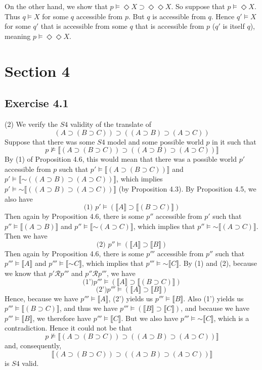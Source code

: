 \documentclass{article}
\newcommand*{\oldneg}{\mathord{\sim}}
\newcommand{\lbc}{\llbracket}
\newcommand{\rbc}{\rrbracket}
\theoremstyle{definition}
\begin{document}
On the other hand, we show that $p\vDash\Diamond X\supset\Diamond\Diamond X$. So suppose that 
$p\vDash\Diamond X$. Thus $q\vDash X$ for some $q$ accessible from $p$. But $q$ is accessible from 
$q$. Hence $q'\vDash X$ for some $q'$ that is accessible from some $q$ that is accessible from 
$p$ ($q'$ is itself $q$), meaning $p\vDash\Diamond\Diamond X$.

\section*{Section 4}

\subsection*{Exercise 4.1}
(2) We verify the $S4$ validity of the translate of
\[ (A\supset(B\supset C))\supset((A\supset B)\supset(A\supset C)) \]
Suppose that there was some $S4$ model and some possible world $p$ in it such that 
\[ p\nvDash\lbc (A\supset(B\supset C))\supset((A\supset B)\supset(A\supset C))\rbc \]
By (1) of Proposition 4.6, 
this would mean that there was a possible world $p'$ accessible from $p$ such that 
$p'\vDash\lbc (A\supset(B\supset C))\rbc$ and
$p'\vDash\lbc \oldneg((A\supset B)\supset(A\supset C))\rbc$, which implies
$p'\vDash\oldneg\lbc((A\supset B)\supset(A\supset C))\rbc$ (by Proposition 4.3). 
By Proposition 4.5, we also have
\[\textrm{(1) }p'\vDash(\lbc A\rbc\supset\lbc(B\supset C)\rbc) \]
Then again by Proposition 4.6,
there is some $p''$ accessible from $p'$ such that
$p''\vDash\lbc (A\supset B)\rbc$ and $p''\vDash\lbc\oldneg (A\supset C)\rbc$, which implies 
that $p''\vDash\oldneg\lbc(A\supset C)\rbc$. Then we have
\[\textrm{(2) }p''\vDash(\lbc A\rbc\supset\lbc B\rbc) \] 
Then again by Proposition 4.6,
there is some $p'''$ accessible from $p''$ such that
$p'''\vDash\lbc A\rbc$ and $p'''\vDash\lbc\oldneg C\rbc$, which implies that
$p'''\vDash\oldneg\lbc C\rbc$. By (1) and (2), because we know that 
$p'\mathcal{R}p'''$ and $p''\mathcal{R}p'''$, we have
\[\textrm{(1')}p'''\vDash(\lbc A\rbc\supset\lbc(B\supset C)\rbc) \]
\[\textrm{(2')}p'''\vDash(\lbc A\rbc\supset\lbc B\rbc) \]
Hence, because we have $p'''\vDash\lbc A\rbc$, (2') yields us 
$p'''\vDash\lbc B\rbc$. Also (1') yields us $p'''\vDash\lbc (B\supset C)\rbc$, and thus we 
have $p'''\vDash (\lbc B\rbc\supset\lbc C\rbc)$, and because we have $p'''\vDash\lbc B\rbc$, we 
therefore have $p'''\vDash\lbc C\rbc$. But we also have $p'''\vDash\oldneg\lbc C\rbc$, which is a contradiction.
Hence it could not be that
\[ p\nvDash\lbc (A\supset(B\supset C))\supset((A\supset B)\supset(A\supset C))\rbc \]
and, consequently,
\[ \lbc (A\supset(B\supset C))\supset((A\supset B)\supset(A\supset C))\rbc \] is 
$S4$ valid.
\end{document}
